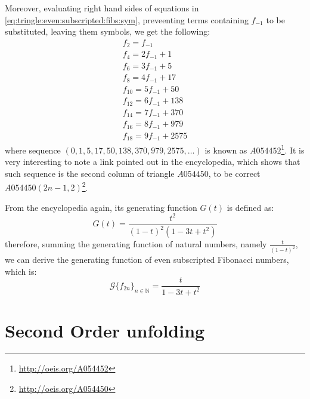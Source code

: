 Moreover, evaluating right hand sides of equations in 
\autoref{eq:tringle:even:subscripted:fibs:sym}, preveenting terms
containing $f_{-1}$ to be substituted, leaving them symbols, we get
the following:
\begin{displaymath}
    \begin{array}{c}
        f_{2} = f_{-1}\\
        f_{4} = 2 f_{-1} + 1\\
        f_{6} = 3 f_{-1} + 5\\
        f_{8} = 4 f_{-1} + 17\\
        f_{10} = 5 f_{-1} + 50\\
        f_{12} = 6 f_{-1} + 138\\
        f_{14} = 7 f_{-1} + 370\\
        f_{16} = 8 f_{-1} + 979\\
        f_{18} = 9 f_{-1} + 2575
    \end{array}
\end{displaymath}
where sequence $(0,1,5,17,50,138,370,979,2575,\ldots)$ is known as 
$A054452$\footnote{\url{http://oeis.org/A054452}}. It is very interesting
to note a link pointed out in the encyclopedia, which shows that
such sequence is the second column of triangle $A054450$, to be 
correct $A054450(2n-1,2)$\footnote{\url{http://oeis.org/A054450}}.

From the encyclopedia again, its generating function $G(t)$ is defined as:
\begin{displaymath}
    G(t) = \frac{t^2}{(1-t)^2 (1-3t+t^2)}
\end{displaymath}
therefore, summing the generating function of natural numbers, namely
$\frac{t}{(1-t)^2}$, we can derive the generating function of even
subscripted Fibonacci numbers, which is:
\begin{displaymath}
    \mathcal{G}\lbrace f_{2n}\rbrace_{n\in\mathbb{N}} = \frac{t}{1 -3t +t^2}
\end{displaymath}

    

\section{Second Order unfolding}


